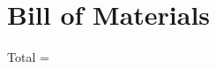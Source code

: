 \documentclass[../main]{subfiles}
\begin{document}
\chapter{Bill of Materials} \label{chp:}

%

\def\BOMCurrentTotal{0}

\def\BOMDUSystemTotal{0}
\def\BOMGrandTotal{0}
\def\BOMTmp{0}
\def\BOMTest{0}

















%



Total = \theBOMGrandTotal

%
%
\end{document}
